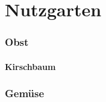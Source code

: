 \part{Nutzgarten}

\pagebreak

\section{Obst}

\subsection{Kirschbaum}

\section{Gemüse}

\pagebreak